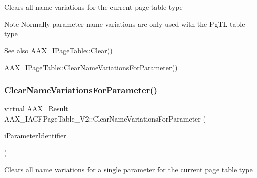 Clears all name variations for the current page table type

\begin{DoxyNote}{Note}
Normally parameter name variations are only used with the {\ttfamily \textquotesingle{}Pg\+TL\textquotesingle{}} table type
\end{DoxyNote}
\begin{DoxySeeAlso}{See also}
\mbox{\hyperlink{a01849_a00a902ce17c43ae32947dba6088936d2}{A\+A\+X\+\_\+\+I\+Page\+Table\+::\+Clear()}} 

\mbox{\hyperlink{a01849_ae6cf05c366d982e8ea92fea1d98f1d22}{A\+A\+X\+\_\+\+I\+Page\+Table\+::\+Clear\+Name\+Variations\+For\+Parameter()}} 
\end{DoxySeeAlso}
\mbox{\label{a01729_af03ce323e3ad6bcfe3b11627698b43c7}} 
\subsubsection{\texorpdfstring{ClearNameVariationsForParameter()}{ClearNameVariationsForParameter()}}
{\footnotesize\ttfamily virtual \mbox{\hyperlink{a00392_a4d8f69a697df7f70c3a8e9b8ee130d2f}{A\+A\+X\+\_\+\+Result}} A\+A\+X\+\_\+\+I\+A\+C\+F\+Page\+Table\+\_\+\+V2\+::\+Clear\+Name\+Variations\+For\+Parameter (\begin{DoxyParamCaption}\item[{\mbox{\hyperlink{a00392_ab4e01b971dac1b25632fd9f710dd8f77}{A\+A\+X\+\_\+\+C\+Page\+Table\+Param\+ID}}}]{i\+Parameter\+Identifier }\end{DoxyParamCaption})\hspace{0.3cm}{\ttfamily [pure virtual]}}





Clears all name variations for a single parameter for the current page table type

